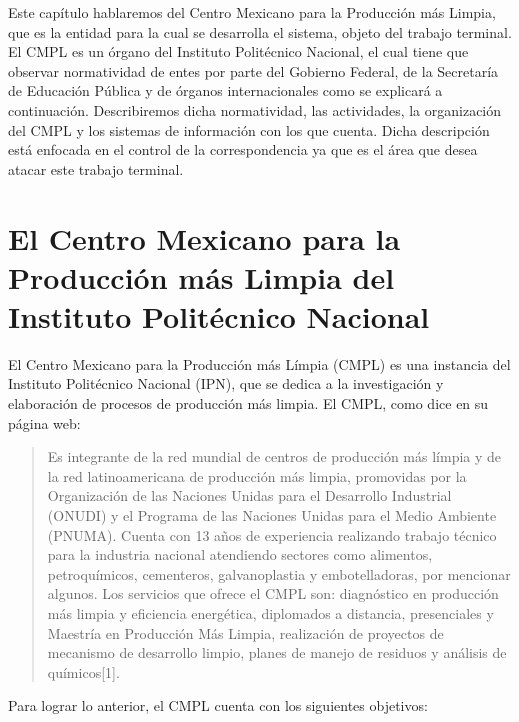 Este capítulo hablaremos del Centro Mexicano para la Producción más Limpia, que es la entidad para la cual se desarrolla el sistema, objeto del trabajo terminal. El CMPL es un órgano del Instituto Politécnico Nacional, el cual tiene que observar normatividad de entes por parte del Gobierno Federal, de la Secretaría de Educación Pública y de órganos internacionales como se explicará a continuación. Describiremos dicha normatividad, las actividades, la organización del CMPL y los sistemas de información con los que cuenta. Dicha descripción está enfocada en el control de la correspondencia ya que es el área que desea atacar este trabajo terminal.

\section{El Centro Mexicano para la Producción más Limpia del Instituto Politécnico Nacional}

	El Centro Mexicano para la Producción más Límpia (CMPL) es una instancia del Instituto Politécnico Nacional (IPN), que se dedica a la investigación y elaboración de procesos de producción más limpia. El CMPL, como dice en su página web:

	\begin{quotation}Es integrante de la red mundial de centros de producción más límpia y de la red latinoamericana de producción más limpia, promovidas por la Organización de las Naciones Unidas para el Desarrollo Industrial (ONUDI) y el Programa de las Naciones Unidas para el Medio Ambiente (PNUMA). Cuenta con 13 años de experiencia realizando trabajo técnico para la industria nacional atendiendo sectores como alimentos, petroquímicos, cementeros, galvanoplastia y embotelladoras, por mencionar algunos. Los servicios que ofrece el CMPL son: diagnóstico en producción más limpia y eficiencia energética, diplomados a distancia, presenciales y Maestría en Producción Más Limpia, realización de proyectos de mecanismo de desarrollo limpio, planes de manejo de residuos y análisis de químicos[1].
	\end{quotation}
	
	Para lograr lo anterior, el CMPL cuenta con los siguientes objetivos:
	
